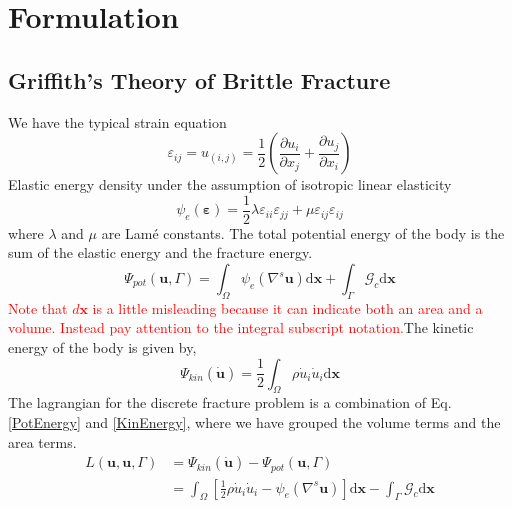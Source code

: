 \documentclass[12pt,3p]{article}
\numberwithin{equation}{section}
\begin{document}
\section{Formulation}

\subsection{Griffith's Theory of Brittle Fracture}
We have the typical strain equation
\begin{equation}\label{Strain}
\varepsilon_{i j} = u_{(i, j)} =\frac{1}{2}\left(\frac{\partial u_{i}}{\partial x_{j}}+\frac{\partial u_{j}}{\partial x_{i}}\right)
\end{equation}
Elastic energy density under the assumption of isotropic linear elasticity
\begin{equation}\label{ElasticEnergyDensity}
\psi_{e}(\boldsymbol{\varepsilon}) = \frac{1}{2} \lambda \varepsilon_{i i} \varepsilon_{j j}+\mu \varepsilon_{i j} \varepsilon_{i j}
\end{equation}
where $\lambda$ and $\mu$ are Lamé constants. The total potential energy of the body is the sum of the elastic energy and the fracture energy. 
\begin{equation}\label{PotEnergy}
\Psi_{p o t}(\boldsymbol{u}, \Gamma)=\int_{\Omega} \psi_{e}\left(\nabla^{s} \boldsymbol{u}\right) \mathrm{d} \boldsymbol{x}+\int_{\Gamma} \mathcal{G}_{c} \mathrm{d} \boldsymbol{x}
\end{equation}
\textcolor{red}{Note that $d \mathbf{x}$ is a little misleading because it can indicate both an area and a volume. Instead pay attention to the integral subscript notation.}The kinetic energy of the body is given by, 
\begin{equation}\label{KinEnergy}
\Psi_{k i n}(\dot{\boldsymbol{u}})=\frac{1}{2} \int_{\Omega} \rho \dot{u}_{i} \dot{u}_{i} \mathrm{d} \boldsymbol{x}
\end{equation}
The lagrangian for the discrete fracture problem is a combination of Eq. \ref{PotEnergy} and \ref{KinEnergy}, where we have grouped the volume terms and the area terms. 
\begin{equation}\label{Lagrangian}
\begin{aligned}
L(\boldsymbol{u}, \boldsymbol{u}, \Gamma) &=\Psi_{k i n}(\dot{\boldsymbol{u}})-\Psi_{p o t}(\boldsymbol{u}, \Gamma) \\
&=\int_{\Omega}\left[\frac{1}{2} \rho \dot{u}_{i} \dot{u}_{i}-\psi_{e}\left(\nabla^{s} \boldsymbol{u}\right)\right] \mathrm{d} \boldsymbol{x}-\int_{\Gamma} \mathcal{G}_{c} \mathrm{d} \boldsymbol{x}
\end{aligned}
\end{equation}
\end{document}
